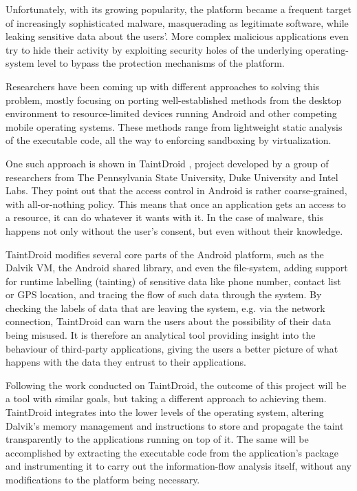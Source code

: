 \documentclass[12pt]{article}
\begin{document}
Unfortunately, with its growing popularity, the platform became a frequent
target of increasingly sophisticated malware, masquerading as legitimate
software, while leaking sensitive data about the users'. More complex
malicious applications even try to hide their activity by exploiting 
security holes of the underlying operating-system level to bypass the 
protection mechanisms of the platform.

Researchers have been coming up with different approaches to solving
this problem, mostly focusing on porting well-established methods from
the desktop environment to resource-limited devices running Android and
other competing mobile operating systems. These methods range from 
lightweight static analysis of the executable code, all the way to 
enforcing sandboxing by virtualization. 

One such approach is shown in TaintDroid \cite{www.appanalysis.org}, 
project developed by a group of researchers from The Pennsylvania State
University, Duke University and Intel Labs. They point out that the
access control in Android is rather coarse-grained, with all-or-nothing
policy. This means that once an application gets an access to a resource,
it can do whatever it wants with it. In the case of malware, this happens
not only without the user's consent, but even without their knowledge.

TaintDroid modifies several core parts of the Android platform, such as 
the Dalvik VM, the Android shared library, and even the file-system, 
adding support for runtime labelling (tainting) of sensitive data like 
phone number, contact list or GPS location, and tracing the flow of such 
data through the system. By checking the labels of data that are leaving 
the system, e.g. via the network connection, TaintDroid can warn the 
users about the possibility of their data being misused. It is therefore 
an analytical tool providing insight into the behaviour of third-party
applications, giving the users a better picture of what happens with
the data they entrust to their applications.

Following the work conducted on TaintDroid, the outcome of this project 
will be a tool with similar goals, but taking a different approach to 
achieving them. TaintDroid integrates into the lower levels of the 
operating system, altering Dalvik's memory management and instructions 
to store and propagate the taint transparently to the applications 
running on top of it. The same will be accomplished by extracting the
executable code from the application's package and instrumenting it
to carry out the information-flow analysis itself, without any
modifications to the platform being necessary.
\end{document}
